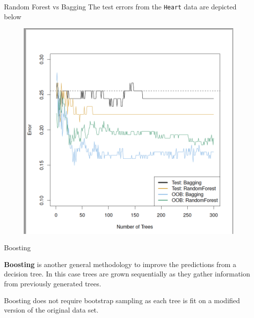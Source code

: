 \documentclass{beamer}
\begin{document}
	\begin{frame}{Random Forest vs Bagging}
		The test errors from the {\tt Heart} data are depicted below
		\begin{figure}[h]
			\centering
			\includegraphics[scale=0.35]{../../Figures/fig_bagging.png}
		\end{figure}
	\end{frame}
	
	\begin{frame}{Boosting}
		
		{\bf Boosting} is another general methodology to improve the predictions from a decision tree. 
		In this case trees are grown sequentially as they gather information from previously generated trees. 
		
		Boosting does not require bootstrap sampling as each tree is fit on a modified version of the original data set.
		
		
		
	\end{frame}
	
\end{document}

